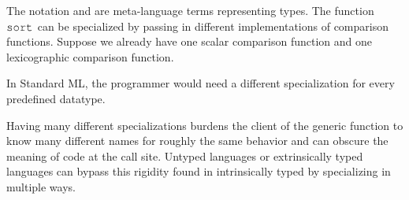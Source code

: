 \documentclass[acmsmall]{acmart}
\theoremstyle{definition}
\begin{document}
\noindent
The notation  and  are meta-language terms representing types.
The function $\J{sort}$ can be specialized by passing in different implementations of comparison functions.
Suppose we already have one scalar comparison function and one lexicographic comparison function.


\noindent
In Standard ML, the programmer would need a different specialization for every predefined
datatype. 


\noindent
Having many different specializations burdens the client of
the generic function to know many different names for roughly the same behavior and can obscure the meaning
of code at the call site. 
Untyped languages or extrinsically typed languages can bypass this rigidity found in intrinsically typed by specializing in multiple ways.

\end{document}
